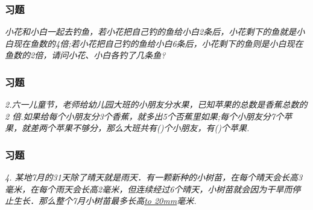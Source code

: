\begin{frame}
    \frametitle{习题\theframecounter}
    \textit{小花和小白一起去钓鱼，若小花把自己钓的鱼给小白2条后，小花剩下的鱼就是小白现在鱼数的4倍;若小花把自己钓的鱼给小白6条后，小花剩下的鱼则是小白现在鱼数的2倍，请问小花、小白各钓了几条鱼?} 
\end{frame}

\begin{frame}
    \frametitle{习题\theframecounter}
    \textit{2.六一儿童节，老师给幼儿园大班的小朋友分水果，已知苹果的总数是香蕉总数的 2 倍.如果给每个小朋友分3个香蕉，就多出5个否蕉里如果;每个小朋友分7个苹果，就差两个苹果不够分，那么大班共有()个小朋友，有()个苹果.} 
\end{frame}


\begin{frame}
    \frametitle{习题\theframecounter}
    \textit{4.	某地7月的31天除了晴天就是雨天．有一颗新种的小树苗，在每个晴天会长高3毫米，在每个雨天会长高2毫米，但连续经过6个晴天，小树苗就会因为干旱而停止生长．那么整个7月小树苗最多长高\underline{\hbox to 20mm{}}毫米.} 
\end{frame}

